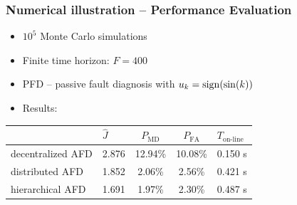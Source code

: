 \documentclass[usenames,dvipsnames]{beamer}
\def\ist{\prescript{1\!}{}}
\def\iind{\prescript{2\!}{}}
\def\nth{\prescript{n\!}{}}
\begin{document}
\begin{frame}
\end{frame}
\begin{frame}
  \frametitle{Numerical illustration -- Performance Evaluation}
  \begin{itemize}
    \item  $10^5$ Monte Carlo simulations
    \item Finite time horizon: $F=400$
    \item PFD -- passive fault diagnosis with $u_k=\operatorname*{sign}(\sin(k))$ 
    \item Results:
  \end{itemize}
  \begin{center}
    \begin{tabular}{llS[table-format=2.2]S[table-format=2.2]l}\toprule
      &$\hat{J}$& $P_{\text{MD}}$ & $P_{\text{FA}}$ & $T_{\text{on-line}}$\\\midrule
      decentralized AFD     & 2.876 & 12.94\si{\percent} & 10.08\si{\percent} &0.150 \si{\second}\\
      distributed AFD     & 1.852 & 2.06\si{\percent} & 2.56\si{\percent} &0.421 \si{\second}\\
      hierarchical AFD      & 1.691 & 1.97\si{\percent} & 2.30\si{\percent} &0.487 \si{\second}\\\bottomrule
    \end{tabular} 
  \end{center}
\end{frame}
\end{document}
